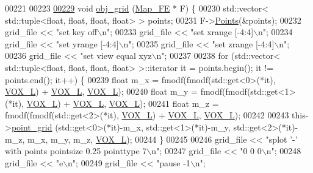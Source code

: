 \begin{DoxyCode}
{00221 
00223 
\hypertarget{Logging_8hpp_source.tex_l00229}{}\hyperlink{classLogger_ac58fee4bd66a5359deb29a86948d584d}{00229}     \textcolor{keywordtype}{void} \hyperlink{classLogger_ac58fee4bd66a5359deb29a86948d584d}{obj\_grid} (\hyperlink{classMap__FE}{Map\_FE} * F) \{
00230         std::vector< std::tuple<float, float, float, float> > points;
00231         F->\hyperlink{classMap__FE_aedfee41631a7287c9eb377ccb05317d6}{Points}(&points);
00232         grid\_file << \textcolor{stringliteral}{"set key off\(\backslash\)n"};
00233         grid\_file << \textcolor{stringliteral}{"set xrange [-4:4]\(\backslash\)n"};
00234         grid\_file << \textcolor{stringliteral}{"set yrange [-4:4]\(\backslash\)n"};
00235         grid\_file << \textcolor{stringliteral}{"set zrange [-4:4]\(\backslash\)n"};
00236         grid\_file << \textcolor{stringliteral}{"set view equal xyz\(\backslash\)n"};
00237 
00238         \textcolor{keywordflow}{for} (std::vector< std::tuple<float, float, float, float> >::iterator it = points.begin(); it != 
      points.end(); it++) \{
00239             \textcolor{keywordtype}{float} m\_x = fmodf(fmodf(std::get<0>(*it), \hyperlink{Voxel_8cuh_a3c1c8b966e30fa8ca2de07abe3b3d74a}{VOX\_L}) + \hyperlink{Voxel_8cuh_a3c1c8b966e30fa8ca2de07abe3b3d74a}{VOX\_L}, 
      \hyperlink{Voxel_8cuh_a3c1c8b966e30fa8ca2de07abe3b3d74a}{VOX\_L});
00240             \textcolor{keywordtype}{float} m\_y = fmodf(fmodf(std::get<1>(*it), \hyperlink{Voxel_8cuh_a3c1c8b966e30fa8ca2de07abe3b3d74a}{VOX\_L}) + \hyperlink{Voxel_8cuh_a3c1c8b966e30fa8ca2de07abe3b3d74a}{VOX\_L}, 
      \hyperlink{Voxel_8cuh_a3c1c8b966e30fa8ca2de07abe3b3d74a}{VOX\_L});
00241             \textcolor{keywordtype}{float} m\_z = fmodf(fmodf(std::get<2>(*it), \hyperlink{Voxel_8cuh_a3c1c8b966e30fa8ca2de07abe3b3d74a}{VOX\_L}) + \hyperlink{Voxel_8cuh_a3c1c8b966e30fa8ca2de07abe3b3d74a}{VOX\_L}, 
      \hyperlink{Voxel_8cuh_a3c1c8b966e30fa8ca2de07abe3b3d74a}{VOX\_L});
00242             
00243             this->\hyperlink{classLogger_a38c5de03e0de7deffd7b516b13f826ff}{point\_grid} (std::get<0>(*it)-m\_x, std::get<1>(*it)-m\_y, std::get<2>(*it)-m\_z, 
      m\_x, m\_y, m\_z, \hyperlink{Voxel_8cuh_a3c1c8b966e30fa8ca2de07abe3b3d74a}{VOX\_L});
00244         \}
00245 
00246         grid\_file << \textcolor{stringliteral}{"splot '-' with points pointsize 0.25 pointtype 7\(\backslash\)n"};
00247         grid\_file << \textcolor{stringliteral}{"0 0 0\(\backslash\)n"};
00248         grid\_file << \textcolor{stringliteral}{"e\(\backslash\)n"};
00249         grid\_file << \textcolor{stringliteral}{"pause -1\(\backslash\)n"};
}
\end{DoxyCode}
